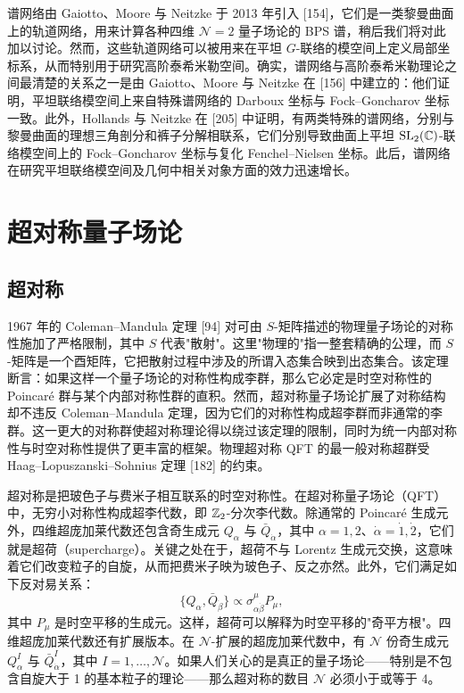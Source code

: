 
谱网络由 Gaiotto、Moore 与 Neitzke 于 2013 年引入 [154]，它们是一类黎曼曲面上的轨道网络，用来计算各种四维 $\mathcal{N}=2$ 量子场论的 BPS 谱，稍后我们将对此加以讨论。然而，这些轨道网络可以被用来在平坦 $G$-联络的模空间上定义局部坐标系，从而特别用于研究高阶泰希米勒空间。确实，谱网络与高阶泰希米勒理论之间最清楚的关系之一是由 Gaiotto、Moore 与 Neitzke 在 [156] 中建立的：他们证明，平坦联络模空间上来自特殊谱网络的 Darboux 坐标与 Fock--Goncharov 坐标一致。此外，Hollands 与 Neitzke 在 [205] 中证明，有两类特殊的谱网络，分别与黎曼曲面的理想三角剖分和裤子分解相联系，它们分别导致曲面上平坦 $\operatorname{SL}_2(\mathbb{C})$-联络模空间上的 Fock--Goncharov 坐标与复化 Fenchel--Nielsen 坐标。此后，谱网络在研究平坦联络模空间及几何中相关对象方面的效力迅速增长。

\section*{超对称量子场论}

\subsection*{超对称}

1967 年的 Coleman--Mandula 定理 [94] 对可由 $S$-矩阵描述的物理量子场论的对称性施加了严格限制，其中 $S$ 代表"散射"。这里"物理的"指一整套精确的公理，而 $S$-矩阵是一个酉矩阵，它把散射过程中涉及的所谓入态集合映到出态集合。该定理断言：如果这样一个量子场论的对称性构成李群，那么它必定是时空对称性的 Poincar\'e 群与某个内部对称性群的直积。然而，超对称量子场论扩展了对称结构却不违反 Coleman--Mandula 定理，因为它们的对称性构成超李群而非通常的李群。这一更大的对称群使超对称理论得以绕过该定理的限制，同时为统一内部对称性与时空对称性提供了更丰富的框架。物理超对称 QFT 的最一般对称超群受 Haag--Lopuszanski--Sohnius 定理 [182] 的约束。



超对称是把玻色子与费米子相互联系的时空对称性。在超对称量子场论（QFT）中，无穷小对称性构成超李代数，即 $\mathbb{Z}_2$-分次李代数。除通常的 Poincar\'e 生成元外，四维超庞加莱代数还包含奇生成元 $Q_\alpha$ 与 $\bar Q_{\dot\alpha}$，其中 $\alpha=1,2$、$\dot\alpha=\dot 1,\dot 2$，它们就是超荷（supercharge）。关键之处在于，超荷不与 Lorentz 生成元交换，这意味着它们改变粒子的自旋，从而把费米子映为玻色子、反之亦然。此外，它们满足如下反对易关系：
\[
\{Q_\alpha,\bar Q_{\dot\beta}\}\propto\sigma^\mu_{\alpha\dot\beta}P_\mu,
\]
其中 $P_\mu$ 是时空平移的生成元。这样，超荷可以解释为时空平移的"奇平方根"。四维超庞加莱代数还有扩展版本。在 $\mathcal{N}$-扩展的超庞加莱代数中，有 $\mathcal{N}$ 份奇生成元 $Q^I_\alpha$ 与 $\bar Q^I_{\dot\alpha}$，其中 $I=1,\dots,\mathcal{N}$。如果人们关心的是真正的量子场论——特别是不包含自旋大于 1 的基本粒子的理论——那么超对称的数目 $\mathcal{N}$ 必须小于或等于 4。

